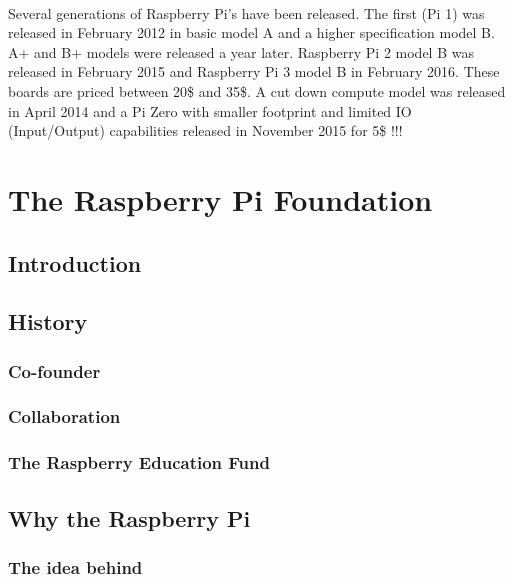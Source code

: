 \documentclass[10pt,a4paper]{article}
\begin{document}
\paragraph{}Several generations of Raspberry Pi's have been released. The first (Pi 1) was released in February 2012 in basic model A and a higher specification model B. A+ and B+ models were released a year later. Raspberry Pi 2 model B was released in February 2015 and Raspberry Pi 3 model B in February 2016. These boards are priced between 20\$ and 35\$. A cut down compute model was released in April 2014 and a Pi Zero with smaller footprint and limited IO (Input/Output) capabilities released in November 2015 for 5\$ !!!

\newpage

\tableofcontents

\newpage

\section{The Raspberry Pi Foundation}

\subsection{Introduction}

\subsection{History}

\subsubsection{Co-founder}

\subsubsection{Collaboration}

\subsubsection{The Raspberry Education Fund}


\subsection{Why the Raspberry Pi}

\subsubsection{The idea behind}
\end{document}
